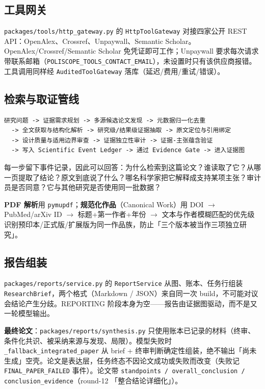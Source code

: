 \subsection{工具网关}

\texttt{packages/tools/http\_gateway.py} 的 \texttt{HttpToolGateway} 对接四家公开 REST API：OpenAlex、Crossref、Unpaywall、Semantic Scholar。OpenAlex/Crossref/Semantic Scholar 免凭证即可工作；Unpaywall 要求每次请求带联系邮箱（\texttt{POLISCOPE\_TOOLS\_CONTACT\_EMAIL}），未设置时只有该供应商报错。工具调用同样经 \texttt{AuditedToolGateway} 落库（延迟/费用/重试/错误）。

\subsection{检索与取证管线}

\begin{lstlisting}
研究问题 -> 证据需求规划 -> 多源候选论文发现 -> 元数据归一化去重
  -> 全文获取与结构化解析 -> 研究级/结果级证据抽取 -> 原文定位与引用绑定
  -> 设计质量与适用边界审查 -> 证据独立性审计 -> 证据-主张蕴含验证
  -> 写入 Scientific Event Ledger -> 通过 Evidence Gate -> 进入证据图
\end{lstlisting}

每一步留下事件记录，因此可以回答：为什么检索到这篇论文？谁读取了它？从哪一页提取了结论？原文到底说了什么？哪名科学家把它解释成支持某项主张？审计员是否同意？它与其他研究是否使用同一批数据？

\textbf{PDF 解析}用 \texttt{pymupdf}；\textbf{规范化作品}（Canonical Work）用 DOI $\rightarrow$ PubMed/arXiv ID $\rightarrow$ 标题+第一作者+年份 $\rightarrow$ 文本与作者模糊匹配的优先级识别预印本/正式版/扩展版为同一作品族，防止「三个版本被当作三项独立研究」。

\subsection{报告组装}

\texttt{packages/reports/service.py} 的 \texttt{ReportService} 从图、账本、任务行组装 \texttt{ResearchBrief}，两个格式（Markdown / JSON）来自同一次 build，不可能对议会结论产生分歧。REPORTING 阶段本身为空——报告由证据图驱动，而不是又一轮模型输出。

\textbf{最终论文}：\texttt{packages/reports/synthesis.py} 只使用账本已记录的材料（终审、条件化共识、被采纳来源与发现、局限）。模型失败时 \texttt{\_fallback\_integrated\_paper} 从 brief + 终审判断确定性组装，绝不输出「尚未生成」空壳。论文是表达层，任务终态不因论文成功或失败而改变（失败记 \texttt{FINAL\_PAPER\_FAILED} 事件）。论文带 \texttt{standpoints / overall\_conclusion / conclusion\_evidence}（round-12 「整合结论详细化」）。


